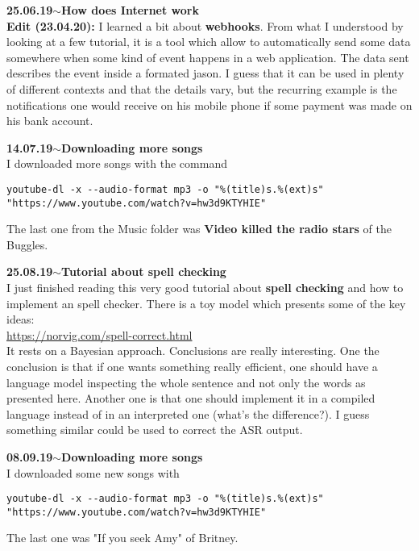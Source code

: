 \documentclass[11pt,a4paper]{article}
\newenvironment{loggentry}[2]%
{\noindent\textbf{#1}\hspace{1cm}$\mathbf{\sim}$\text{ }\textbf{#2}\\}{\vspace{0.5cm}}
\begin{document}
\begin{loggentry}{25.06.19}{How does Internet work}
\textbf{Edit (23.04.20):} I learned a bit about \textbf{webhooks}. From what I understood by looking at a few tutorial, it is a tool which allow to automatically send some data somewhere when some kind of event happens in a web application. The data sent describes the event inside a formated jason. I guess that it can be used in plenty of different contexts and that the details vary, but the recurring example is the notifications one would receive on his mobile phone if some payment was made on his bank account.\\


\end{loggentry}

\begin{loggentry}{14.07.19}{Downloading more songs}
I downloaded more songs with the command
\begin{verbatim}
youtube-dl -x --audio-format mp3 -o "%(title)s.%(ext)s" "https://www.youtube.com/watch?v=hw3d9KTYHIE"
\end{verbatim}
The last one from the Music folder was \textbf{Video killed the radio stars} of the Buggles. 
\end{loggentry}


\begin{loggentry}{25.08.19}{Tutorial about spell checking}

I just finished reading this very good tutorial about \textbf{spell checking} and how to implement an spell checker.  There is a toy model which presents some of the key ideas:\\
\url{https://norvig.com/spell-correct.html}\\
It rests on a Bayesian approach. Conclusions are really interesting. One the conclusion is that if one wants something really efficient, one should have a language model inspecting the whole sentence and not only the words as presented here. Another one is that one should implement it in a compiled language instead of in an interpreted one (what's the difference?). I guess something similar could be used to correct the ASR output.

\end{loggentry}


\begin{loggentry}{08.09.19}{Downloading more songs}

I downloaded some new songs with
\begin{verbatim}
youtube-dl -x --audio-format mp3 -o "%(title)s.%(ext)s" "https://www.youtube.com/watch?v=hw3d9KTYHIE"
\end{verbatim}

The last one was "If you seek Amy" of Britney.

\end{loggentry}
\end{document}
